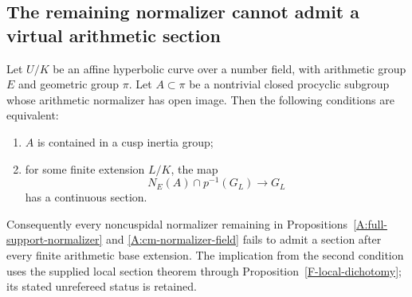 \subsection{The remaining normalizer cannot admit a virtual arithmetic section}

\begin{proposition}
\label{A:split-normalizer}
Let $U/K$ be an affine hyperbolic curve over a number
field, with arithmetic group $E$ and geometric group
$\pi$. Let $A\subset\pi$ be a nontrivial closed
procyclic subgroup whose arithmetic normalizer has
open image. Then the following conditions are equivalent:
\begin{enumerate}
\item $A$ is contained in a cusp inertia group;
\item for some finite extension $L/K$, the map
\[
 N_E(A)\cap p^{-1}(G_L)\longrightarrow G_L
\]
has a continuous section.
\end{enumerate}
Consequently every noncuspidal normalizer remaining
in Propositions~\ref{A:full-support-normalizer} and
\ref{A:cm-normalizer-field} fails to admit a section
after every finite arithmetic base extension.
The implication from the second condition uses the
supplied local section theorem through
Proposition~\ref{F-local-dichotomy}; its stated
unrefereed status is retained.
\end{proposition}
